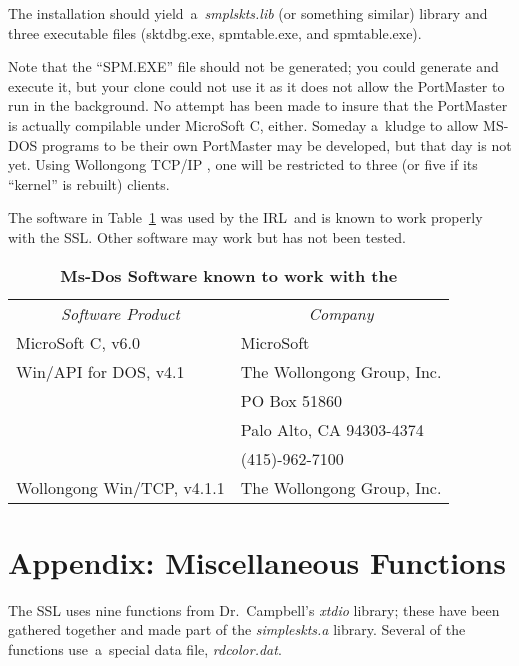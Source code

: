 \documentclass[12pt]{article}
\def\SSL{{\small SSL}}
\def\IRL{{\small IRL}}
\def\TCP{{\small TCP/IP }}
\begin{document}
The installation should yield~a~{\em smplskts.lib} (or something similar)
library and three executable files (sktdbg.exe, spmtable.exe, and
spmtable.exe).

Note that the ``{\small SPM.EXE}'' file should not be generated; you could
generate and execute it, but your clone could not use it as it does not allow
the PortMaster to run in the background.  No attempt has been made to insure
that the PortMaster is actually compilable under MicroSoft C, either.  Someday
a~kludge to allow MS-DOS programs to be their own PortMaster may be developed,
but that day is not yet.  Using Wollongong \TCP, one will be restricted to
three (or five if its ``kernel'' is rebuilt) clients.

The software in Table~\ref{msdos-swlist} was used by the \IRL\ and is known to
work properly with the \SSL.  Other software may work but has not been tested.

\begin{table}[h]
  \begin{center}
  \caption{\bf Ms-Dos Software known to work with the }
  \label{msdos-swlist}
  \begin{tabular}{ll}
    \multicolumn{1}{c}{\em Software Product} & \multicolumn{1}{c}{\em Company} \\
    MicroSoft C, v6.0                        & MicroSoft                       \\
    {\small Win/API} for {\small DOS}, v4.1  & The Wollongong Group, Inc.      \\
                                             & PO Box 51860                    \\
                                             & Palo Alto, CA 94303-4374        \\
                                             & (415)-962-7100                  \\
    Wollongong Win/{\small TCP}, v4.1.1      & The Wollongong Group, Inc.      \\
  \end{tabular}
  \end{center}
\end{table}


\newpage
\section{Appendix: Miscellaneous Functions}

The {\SSL} uses nine functions from Dr.~Campbell's {\em xtdio} library; these
have been gathered together and made part of the {\em simpleskts.a} library.
Several of the functions use~a~special data file, {\em rdcolor.dat}.
\end{document}
